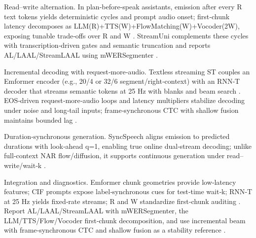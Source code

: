 Read–write alternation. In plan‑before‑speak assistants, emission after every R text tokens yields deterministic cycles and prompt audio onset; first‑chunk latency decomposes as LLM(R)+TTS(W)+FlowMatching(W)+Vocoder(2W), exposing tunable trade‑offs over R and W \cite{fang2025llamaomni2llmbasedrealtimespokenchatbota}. StreamUni complements these cycles with transcription‑driven gates and semantic truncation and reports AL/LAAL/StreamLAAL using mWERSegmenter \cite{guo2025streamuniachievingstreamingspeechtransla}.

Incremental decoding with request‑more‑audio. Textless streaming ST couples an Emformer encoder (e.g., 20/4 or 32/6 segment/right‑context) with an RNN‑T decoder that streams semantic tokens at 25 Hz with blanks and beam search \cite{zhao2024textlessstreamingspeechtranslationsemant}. EOS‑driven request‑more‑audio loops and latency multipliers stabilize decoding under noise and long‑tail inputs; frame‑synchronous CTC with shallow fusion maintains bounded lag \cite{ouyang2025cmusiwslt2025simultaneousspeechtranslati,deng2025simuls2sllmunlockingsimultaneousinferenc}.

Duration‑synchronous generation. SyncSpeech aligns emission to predicted durations with look‑ahead q=1, enabling true online dual‑stream decoding; unlike full‑context NAR flow/diffusion, it supports continuous generation under read–write/wait‑k \cite{sheng2025syncspeechlowlatencyefficientdualstreamt}.

Integration and diagnostics. Emformer chunk geometries provide low‑latency features; CIF prompts expose label‑synchronous cues for test‑time wait‑k; RNN‑T at 25 Hz yields fixed‑rate streams; R and W standardize first‑chunk auditing \cite{zhao2024textlessstreamingspeechtranslationsemant,deng2025simuls2sllmunlockingsimultaneousinferenc,fang2025llamaomni2llmbasedrealtimespokenchatbota}. Report AL/LAAL/StreamLAAL with mWERSegmenter, the LLM/TTS/Flow/Vocoder first‑chunk decomposition, and use incremental beam with frame‑synchronous CTC and shallow fusion as a stability reference \cite{guo2025streamuniachievingstreamingspeechtransla,deng2025simuls2sllmunlockingsimultaneousinferenc,fang2025llamaomni2llmbasedrealtimespokenchatbota}.

